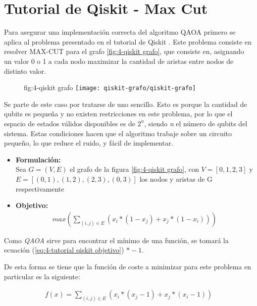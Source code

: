 \section{Tutorial de Qiskit - Max Cut}
\label{sec:4-tutorial de qiskit}

Para asegurar una implementación correcta del algoritmo QAOA primero se aplica al problema presentado en el tutorial de Qiskit \cite{qiskit_tutorial_antiguo}.
Este problema consiste en resolver MAX-CUT para el grafo \ref{fig:4-qiskit grafo}, que consiste en, asignando un valor 0 o 1 a cada nodo maximizar la cantidad de aristas entre nodos de distinto valor.

\begin{figure}[htbp]{fig:4-qiskit grafo}{}
  \centering
  \texttt{[image: qiskit-grafo/qiskit-grafo]}
\end{figure}

Se parte de este caso por tratarse de uno sencillo. Esto es porque la cantidad de qubits es pequeña y no existen restricciones en este problema, por lo que el espacio de estados válidos disponibles es de $2^n$, siendo \textit{n} el número de qubits del sistema. Estas condiciones hacen que el algoritmo trabaje sobre un circuito pequeño, lo que reduce el ruido, y fácil de implementar.

\begin{itemize}
\item \textbf{Formulación:} \\
  Sea $G = (V, E)$ el grafo de la figura \ref{fig:4-qiskit grafo}, con $V = [0, 1, 2, 3]$ y $E = [(0, 1), (1, 2), (2, 3), (0, 3)]$ los nodos y aristas de G respectivamente

\item \textbf{Objetivo:} \\
  \begin{align} \label{eq:4-tutorial qiskit objetivo}
    max(\sum_{(i, j) \in E} (x_i * (1 - x_j) + x_j * (1 - x_i)))
  \end{align}

\end{itemize}

Como \textit{QAOA} sirve para encontrar el mínimo de una función, se tomará la ecuación (\ref{eq:4-tutorial qiskit objetivo}) $*-1$.

De esta forma se tiene que la función de coste a minimizar para este problema en particular es la siguiente:

\begin{align*}
  f(x) = \sum_{(i, j) \in E} (x_i * (x_j - 1) + x_j * (x_i - 1))
\end{align*}

